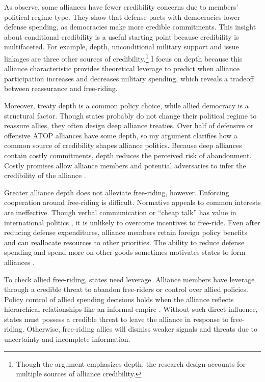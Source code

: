 \documentclass[12pt]{article}
\begin{document}
As \citet{DigiuseppePoast2016} observe, some alliances have fewer credibility concerns due to members' political regime type.
They show that defense pacts with democracies lower defense spending, as democracies make more credible commitments.
This insight about conditional credibility is a useful starting point because credibility is multifaceted. 
For example, depth, unconditional military support \citep{Benson2012, Chibaetal2015} and issue linkages \citep{LongLeeds2006, Poast2012, Poast2013} are three other sources of credibility.\footnote{Though the argument emphasizes depth, the research design accounts for multiple sources of alliance credibility.} 
I focus on depth because this alliance characteristic provides theoretical leverage to predict when alliance participation increases and decreases military spending, which reveals a tradeoff between reassurance and free-riding.  


Moreover, treaty depth is a common policy choice, while allied democracy is a structural factor. 
Though states probably do not change their political regime to reassure allies, they often design deep alliance treaties. 
Over half of defensive or offensive ATOP alliances have some depth, so my argument clarifies how a common source of credibility shapes alliance politics. 
Because deep alliances contain costly commitments, depth reduces the perceived risk of abandonment.  
Costly promises allow alliance members and potential adversaries to infer the credibility of the alliance \citep{Leeds2003, FuhrmannSechser2014}. 


Greater alliance depth does not alleviate free-riding, however. 
Enforcing cooperation around free-riding is difficult.
Normative appeals to common interests are ineffective. 
Though verbal communication or ``cheap talk'' has value in international politics \citep{Trager2010}, it is unlikely to overcome incentives to free-ride. 
Even after reducing defense expenditures, alliance members retain foreign policy benefits and can reallocate resources to other priorities. 
The ability to reduce defense spending and spend more on other goods sometimes motivates states to form alliances \citep{Kimball2010, AllenDigiuseppe2013}. 


To check allied free-riding, states need leverage. 
Alliance members have leverage through a credible threat to abandon free-riders or control over allied policies. 
Policy control of allied spending decisions holds when the alliance reflects hierarchical relationships like an informal empire \citep{Lake1996}. 
Without such direct influence, states must possess a credible threat to leave the alliance in response to free-riding. 
Otherwise, free-riding allies will dismiss weaker signals and threats due to uncertainty and incomplete information. 
\end{document}
